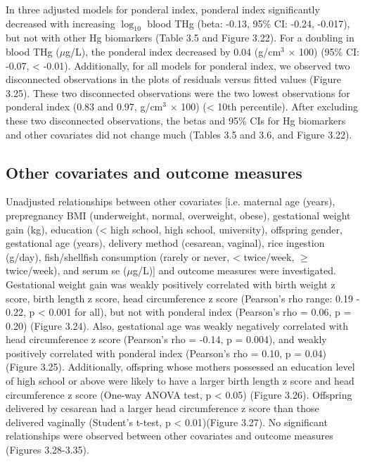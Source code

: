 In three adjusted models for ponderal index, ponderal index significantly decreased with increasing $\log_{10}$ blood THg (beta: -0.13, 95\% CI: -0.24, -0.017), but not with other Hg biomarkers (Table 3.5 and Figure 3.22). For a doubling in blood THg (${\mu}$g/L), the ponderal index decreased by 0.04 (g/cm$^{3}$ \({\times}\) 100) (95\% CI: -0.07, < -0.01). Additionally, for all models for ponderal index, we observed two disconnected observations in the plots of residuals versus fitted values (Figure 3.25). These two disconnected observations were the two lowest observations for ponderal index (0.83 and 0.97, g/cm$^{3}$ \({\times}\) 100) (< 10th percentile). After excluding these two disconnected observations, the betas and 95\% CIs for Hg biomarkers and other covariates did not change much (Tables 3.5 and 3.6, and Figure 3.22).

\subsection{Other covariates and outcome measures}

Unadjusted relationships between other covariates [i.e. maternal age (years), prepregnancy BMI (underweight, normal, overweight, obese), gestational weight gain (kg), education (< high school, high school, university), offspring gender, gestational age (years), delivery method (cesarean, vaginal), rice ingestion (g/day), fish/shellfish consumption (rarely or never, < twice/week, ${\ge}$ twice/week), and serum se (${\mu}$g/L)] and outcome measures were investigated. Gestational weight gain was weakly positively
correlated with birth weight z score, birth length z score, head circumference z score (Pearson's rho range: 0.19 - 0.22, p < 0.001 for all), but not with ponderal index (Pearson's rho = 0.06, p = 0.20) (Figure 3.24). Also, gestational age was weakly negatively correlated with head circumference z score (Pearson's rho = -0.14, p = 0.004), and weakly positively correlated with ponderal index (Pearson's rho = 0.10, p = 0.04) (Figure 3.25). Additionally, offspring whose mothers possessed an education level of high school or above were likely to have a larger birth length z score and head circumference z score (One-way ANOVA test, p < 0.05) (Figure 3.26). Offspring delivered by cesarean had a larger head circumference z score than those delivered vaginally (Student's t-test, p < 0.01)(Figure 3.27). No significant relationships were observed between other covariates and outcome measures (Figures 3.28-3.35).

